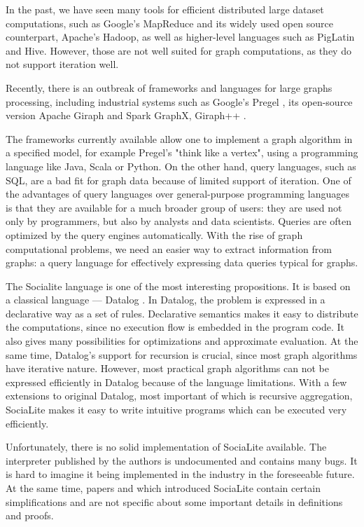 \documentclass{pracamgr}
\theoremstyle{plain}
\theoremstyle{definition}
\theoremstyle{remark}
\begin{document}
In the past, we have seen many tools for efficient distributed large dataset computations, such as Google's MapReduce \cite{mapreduce} and its widely used open source counterpart, Apache's Hadoop, as well as higher-level languages such as PigLatin and Hive. However, those are not well suited for graph computations, as they do not support iteration well.

Recently, there is an outbreak of frameworks and languages for large graphs processing, including industrial systems such as Google's Pregel \cite{pregel}, its open-source version Apache Giraph and Spark GraphX, Giraph++ \cite{giraphpp}.

The frameworks currently available allow one to implement a graph algorithm in a specified model, for example Pregel's "think like a vertex", using a programming language like Java, Scala or Python. On the other hand, query languages, such as SQL, are a bad fit for graph data because of limited support of iteration. One of the advantages of query languages over general-purpose programming languages is that they are available for a much broader group of users: they are used not only by programmers, but also by analysts and data scientists. Queries are often optimized by the query engines automatically. With the rise of graph computational problems, we need an easier way to extract information from graphs: a query language for effectively expressing data queries typical for graphs.

The Socialite \cite{socialite, distsoc} language is one of the most interesting propositions. It is based on a classical language --- Datalog \cite{fod}. In Datalog, the problem is expressed in a declarative way as a set of rules. Declarative semantics makes it easy to distribute the computations, since no execution flow is embedded in the program code. It also gives many possibilities for optimizations and approximate evaluation. At the same time, Datalog's support for recursion is crucial, since most graph algorithms have iterative nature. However, most practical graph algorithms can not be expressed efficiently in Datalog because of the language limitations. With a few extensions to original Datalog, most important of which is recursive aggregation, SociaLite makes it easy to write intuitive programs which can be executed very efficiently.

Unfortunately, there is no solid implementation of SociaLite available. The interpreter published by the authors is undocumented and contains many bugs. It is hard to imagine it being implemented in the industry in the foreseeable future. At the same time, papers \cite{socialite} and \cite{distsoc} which introduced SociaLite contain certain simplifications and are not specific about some important details in definitions and proofs.
\end{document}
